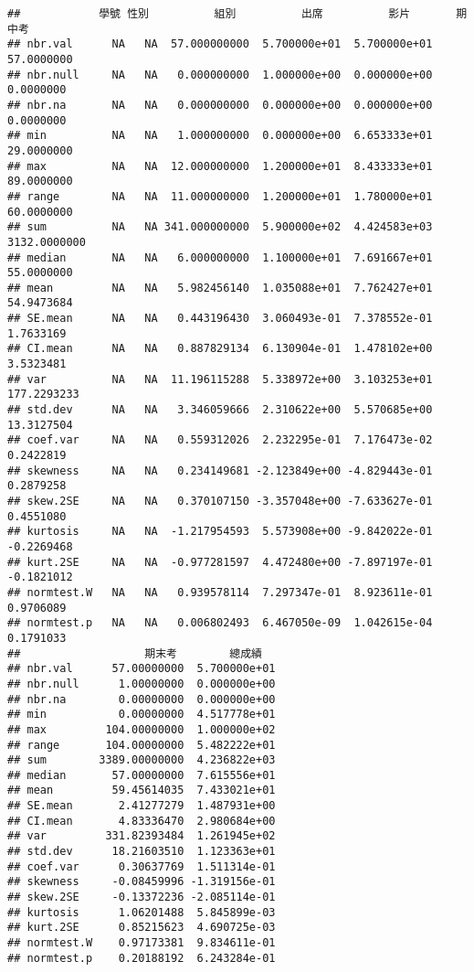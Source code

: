 \documentclass[
]{book}
\begin{document}
\begin{verbatim}
##            學號 性別          組別          出席          影片       期中考
## nbr.val      NA   NA  57.000000000  5.700000e+01  5.700000e+01   57.0000000
## nbr.null     NA   NA   0.000000000  1.000000e+00  0.000000e+00    0.0000000
## nbr.na       NA   NA   0.000000000  0.000000e+00  0.000000e+00    0.0000000
## min          NA   NA   1.000000000  0.000000e+00  6.653333e+01   29.0000000
## max          NA   NA  12.000000000  1.200000e+01  8.433333e+01   89.0000000
## range        NA   NA  11.000000000  1.200000e+01  1.780000e+01   60.0000000
## sum          NA   NA 341.000000000  5.900000e+02  4.424583e+03 3132.0000000
## median       NA   NA   6.000000000  1.100000e+01  7.691667e+01   55.0000000
## mean         NA   NA   5.982456140  1.035088e+01  7.762427e+01   54.9473684
## SE.mean      NA   NA   0.443196430  3.060493e-01  7.378552e-01    1.7633169
## CI.mean      NA   NA   0.887829134  6.130904e-01  1.478102e+00    3.5323481
## var          NA   NA  11.196115288  5.338972e+00  3.103253e+01  177.2293233
## std.dev      NA   NA   3.346059666  2.310622e+00  5.570685e+00   13.3127504
## coef.var     NA   NA   0.559312026  2.232295e-01  7.176473e-02    0.2422819
## skewness     NA   NA   0.234149681 -2.123849e+00 -4.829443e-01    0.2879258
## skew.2SE     NA   NA   0.370107150 -3.357048e+00 -7.633627e-01    0.4551080
## kurtosis     NA   NA  -1.217954593  5.573908e+00 -9.842022e-01   -0.2269468
## kurt.2SE     NA   NA  -0.977281597  4.472480e+00 -7.897197e-01   -0.1821012
## normtest.W   NA   NA   0.939578114  7.297347e-01  8.923611e-01    0.9706089
## normtest.p   NA   NA   0.006802493  6.467050e-09  1.042615e-04    0.1791033
##                   期末考        總成績
## nbr.val      57.00000000  5.700000e+01
## nbr.null      1.00000000  0.000000e+00
## nbr.na        0.00000000  0.000000e+00
## min           0.00000000  4.517778e+01
## max         104.00000000  1.000000e+02
## range       104.00000000  5.482222e+01
## sum        3389.00000000  4.236822e+03
## median       57.00000000  7.615556e+01
## mean         59.45614035  7.433021e+01
## SE.mean       2.41277279  1.487931e+00
## CI.mean       4.83336470  2.980684e+00
## var         331.82393484  1.261945e+02
## std.dev      18.21603510  1.123363e+01
## coef.var      0.30637769  1.511314e-01
## skewness     -0.08459996 -1.319156e-01
## skew.2SE     -0.13372236 -2.085114e-01
## kurtosis      1.06201488  5.845899e-03
## kurt.2SE      0.85215623  4.690725e-03
## normtest.W    0.97173381  9.834611e-01
## normtest.p    0.20188192  6.243284e-01
\end{verbatim}
\end{document}
